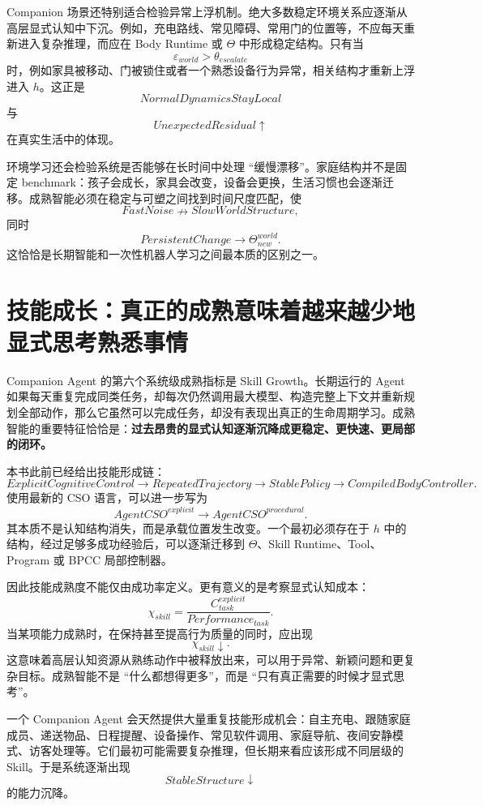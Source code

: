 Companion 场景还特别适合检验异常上浮机制。绝大多数稳定环境关系应逐渐从高层显式认知中下沉。例如，充电路线、常见障碍、常用门的位置等，不应每天重新进入复杂推理，而应在 Body Runtime 或 $\Theta$ 中形成稳定结构。只有当
\[
\varepsilon_{world}
>
\theta_{escalate}
\]
时，例如家具被移动、门被锁住或者一个熟悉设备行为异常，相关结构才重新上浮进入 $h$。这正是
\[
NormalDynamicsStayLocal
\]
与
\[
UnexpectedResidual\uparrow
\]
在真实生活中的体现。

环境学习还会检验系统是否能够在长时间中处理 ``缓慢漂移''。家庭结构并不是固定 benchmark：孩子会成长，家具会改变，设备会更换，生活习惯也会逐渐迁移。成熟智能必须在稳定与可塑之间找到时间尺度匹配，使
\[
FastNoise
\nrightarrow
SlowWorldStructure,
\]
同时
\[
PersistentChange
\rightarrow
\Theta^{world}_{new}.
\]
这恰恰是长期智能和一次性机器人学习之间最本质的区别之一。

\section{技能成长：真正的成熟意味着越来越少地显式思考熟悉事情}

Companion Agent 的第六个系统级成熟指标是 Skill Growth。长期运行的 Agent 如果每天重复完成同类任务，却每次仍然调用最大模型、构造完整上下文并重新规划全部动作，那么它虽然可以完成任务，却没有表现出真正的生命周期学习。成熟智能的重要特征恰恰是：\textbf{过去昂贵的显式认知逐渐沉降成更稳定、更快速、更局部的闭环。}

本书此前已经给出技能形成链：
\[
ExplicitCognitiveControl
\rightarrow
RepeatedTrajectory
\rightarrow
StablePolicy
\rightarrow
CompiledBodyController.
\]
使用最新的 CSO 语言，可以进一步写为
\[
AgentCSO^{explicit}
\rightarrow
AgentCSO^{procedural}.
\]
其本质不是认知结构消失，而是承载位置发生改变。一个最初必须存在于 $h$ 中的结构，经过足够多成功经验后，可以逐渐迁移到 $\Theta$、Skill Runtime、Tool、Program 或 BPCC 局部控制器。

因此技能成熟度不能仅由成功率定义。更有意义的是考察显式认知成本：
\[
\chi_{skill}
=
\frac{
C^{explicit}_{task}
}{
Performance_{task}
}.
\]
当某项能力成熟时，在保持甚至提高行为质量的同时，应出现
\[
\chi_{skill}\downarrow.
\]
这意味着高层认知资源从熟练动作中被释放出来，可以用于异常、新颖问题和更复杂目标。成熟智能不是 ``什么都想得更多''，而是 ``只有真正需要的时候才显式思考''。

一个 Companion Agent 会天然提供大量重复技能形成机会：自主充电、跟随家庭成员、递送物品、日程提醒、设备操作、常见软件调用、家庭导航、夜间安静模式、访客处理等。它们最初可能需要复杂推理，但长期来看应该形成不同层级的 Skill。于是系统逐渐出现
\[
StableStructure\downarrow
\]
的能力沉降。

